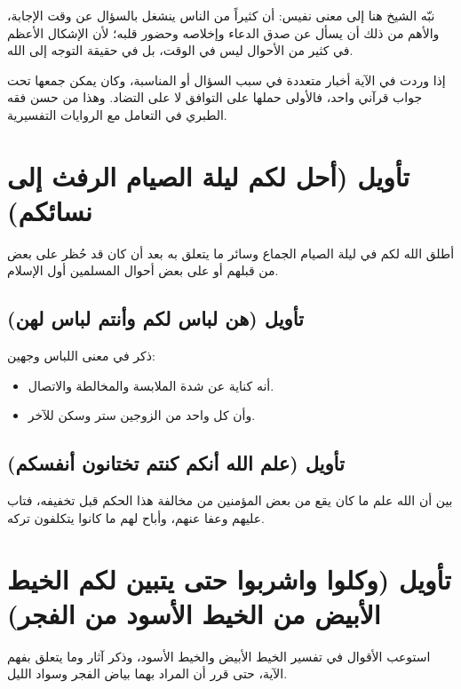 \begin{fawaid}
نبّه الشيخ هنا إلى معنى نفيس: أن كثيراً من الناس ينشغل بالسؤال عن وقت الإجابة، والأهم من ذلك أن يسأل عن صدق الدعاء وإخلاصه وحضور قلبه؛ لأن الإشكال الأعظم في كثير من الأحوال ليس في الوقت، بل في حقيقة التوجه إلى الله.
\end{fawaid}

\begin{fawaid}
إذا وردت في الآية أخبار متعددة في سبب السؤال أو المناسبة، وكان يمكن جمعها تحت جواب قرآني واحد، فالأولى حملها على التوافق لا على التضاد. وهذا من حسن فقه الطبري في التعامل مع الروايات التفسيرية.
\end{fawaid}

\separator

\section{تأويل (أحل لكم ليلة الصيام الرفث إلى نسائكم)}
 أطلق الله لكم في ليلة الصيام الجماع وسائر ما يتعلق به بعد أن كان قد حُظر على بعض من قبلهم أو على بعض أحوال المسلمين أول الإسلام.

\subsection{تأويل (هن لباس لكم وأنتم لباس لهن)}
ذكر  في معنى اللباس وجهين:
\begin{itemize}
    \item أنه كناية عن شدة الملابسة والمخالطة والاتصال.
    \item وأن كل واحد من الزوجين ستر وسكن للآخر.
\end{itemize}

\subsection{تأويل (علم الله أنكم كنتم تختانون أنفسكم)}
بين  أن الله علم ما كان يقع من بعض المؤمنين من مخالفة هذا الحكم قبل تخفيفه، فتاب عليهم وعفا عنهم، وأباح لهم ما كانوا يتكلفون تركه.

\section{تأويل (وكلوا واشربوا حتى يتبين لكم الخيط الأبيض من الخيط الأسود من الفجر)}
استوعب  الأقوال في تفسير الخيط الأبيض والخيط الأسود، وذكر آثار  وما يتعلق بفهم الآية، حتى قرر أن المراد بهما بياض الفجر وسواد الليل.

